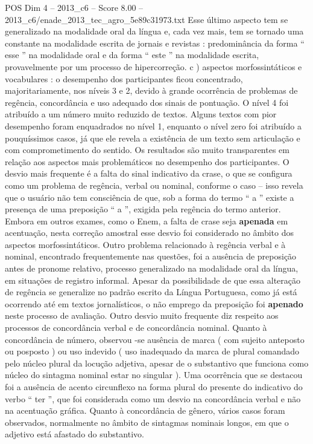 \begin{textsample}{POS Dim 4 – 2013\_c6 – Score 8.00 – 2013\_c6/enade\_2013\_tec\_agro\_5e89c31973.txt}
Esse último aspecto tem se generalizado na modalidade oral da língua e, cada vez mais, tem se tornado uma constante na modalidade escrita de jornais e revistas : predominância da forma “ esse ” na modalidade oral e da forma “ este ” na modalidade escrita, provavelmente por um processo de hipercorreção. c ) aspectos morfossintáticos e vocabulares : o desempenho dos participantes ficou concentrado, majoritariamente, nos níveis 3 e 2, devido à grande ocorrência de problemas de regência, concordância e uso adequado dos sinais de pontuação.
O nível 4 foi atribuído a um número muito reduzido de textos.
Alguns textos com pior desempenho foram enquadrados no nível 1, enquanto o nível zero foi atribuído a pouquíssimos casos, já que ele revela a existência de um texto sem articulação e com comprometimento do sentido.
Os resultados são muito transparentes em relação aos aspectos mais problemáticos no desempenho dos participantes.
O desvio mais frequente é a falta do sinal indicativo da crase, o que se configura como um problema de regência, verbal ou nominal, conforme o caso – isso revela que o usuário não tem consciência de que, sob a forma do termo “ a ” existe a presença de uma preposição “ a ”, exigida pela regência do termo anterior.
Embora em outros exames, como o Enem, a falta de crase seja \textbf{apenada} em acentuação, nesta correção amostral esse desvio foi considerado no âmbito dos aspectos morfossintáticos.
Outro problema relacionado à regência verbal e à nominal, encontrado frequentemente nas questões, foi a ausência de preposição antes de pronome relativo, processo generalizado na modalidade oral da língua, em situações de registro informal.
Apesar da possibilidade de que essa alteração de regência se generalize no padrão escrito da Língua Portuguesa, como já está ocorrendo até em textos jornalísticos, o não emprego da preposição foi \textbf{apenado} neste processo de avaliação.
Outro desvio muito frequente diz respeito aos processos de concordância verbal e de concordância nominal.
Quanto à concordância de número, observou -se ausência de marca ( com sujeito anteposto ou posposto ) ou uso indevido ( uso inadequado da marca de plural comandado pelo núcleo plural da locução adjetiva, apesar de o substantivo que funciona como núcleo do sintagma nominal estar no singular ).
Uma ocorrência que se destacou foi a ausência de acento circunflexo na forma plural do presente do indicativo do verbo “ ter ”, que foi considerada como um desvio na concordância verbal e não na acentuação gráfica.
Quanto à concordância de gênero, vários casos foram observados, normalmente no âmbito de sintagmas nominais longos, em que o adjetivo está afastado do substantivo.

\end{textsample}
